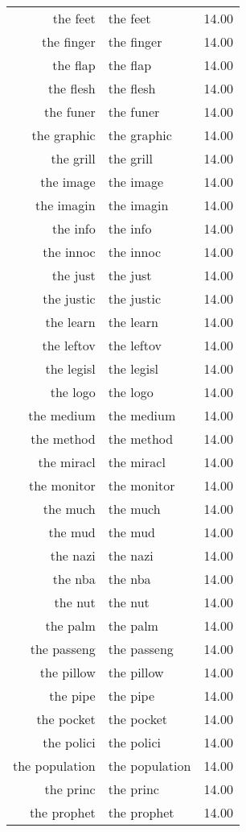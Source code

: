 \begin{table}[ht]
\begin{tabular}{rlr}
  the feet & the feet & 14.00 \\ 
  the finger & the finger & 14.00 \\ 
  the flap & the flap & 14.00 \\ 
  the flesh & the flesh & 14.00 \\ 
  the funer & the funer & 14.00 \\ 
  the graphic & the graphic & 14.00 \\ 
  the grill & the grill & 14.00 \\ 
  the image & the image & 14.00 \\ 
  the imagin & the imagin & 14.00 \\ 
  the info & the info & 14.00 \\ 
  the innoc & the innoc & 14.00 \\ 
  the just & the just & 14.00 \\ 
  the justic & the justic & 14.00 \\ 
  the learn & the learn & 14.00 \\ 
  the leftov & the leftov & 14.00 \\ 
  the legisl & the legisl & 14.00 \\ 
  the logo & the logo & 14.00 \\ 
  the medium & the medium & 14.00 \\ 
  the method & the method & 14.00 \\ 
  the miracl & the miracl & 14.00 \\ 
  the monitor & the monitor & 14.00 \\ 
  the much & the much & 14.00 \\ 
  the mud & the mud & 14.00 \\ 
  the nazi & the nazi & 14.00 \\ 
  the nba & the nba & 14.00 \\ 
  the nut & the nut & 14.00 \\ 
  the palm & the palm & 14.00 \\ 
  the passeng & the passeng & 14.00 \\ 
  the pillow & the pillow & 14.00 \\ 
  the pipe & the pipe & 14.00 \\ 
  the pocket & the pocket & 14.00 \\ 
  the polici & the polici & 14.00 \\ 
  the population & the population & 14.00 \\ 
  the princ & the princ & 14.00 \\ 
  the prophet & the prophet & 14.00 \\ 

\end{tabular}
\end{table}
